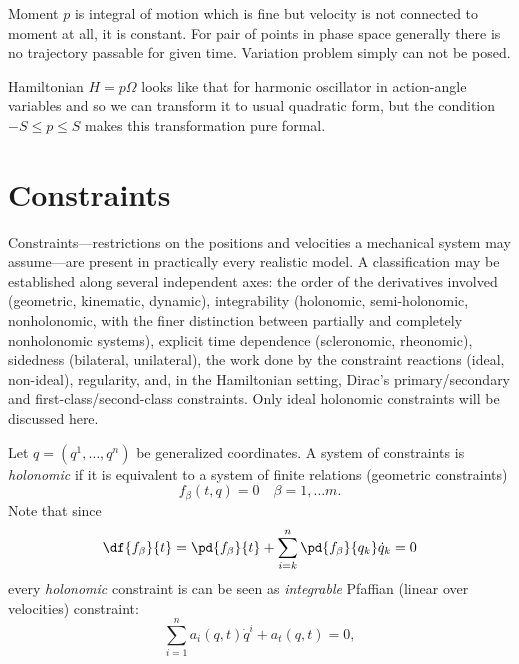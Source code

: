 Moment $ p $ is integral of motion which is fine but velocity is not connected to 
moment at all, it is constant. For pair of points in phase space generally there is
no trajectory passable for given time. Variation problem simply can not be posed.

Hamiltonian $ H=p \Omega $ looks like that for harmonic oscillator in
action-angle variables and so we can  transform it to usual quadratic form, but
the condition $  -S\le p \le S$ makes this transformation pure formal.

\section{Constraints}
\label{sec:cm-const}
Constraints---restrictions on the positions and velocities a mechanical system may
assume---are present in practically every realistic model.   A classification may be established along several independent axes: the order of the
derivatives involved (geometric, kinematic, dynamic), integrability (holonomic,
semi-holonomic, nonholonomic, with the finer distinction between partially and completely
nonholonomic systems), explicit time dependence (scleronomic, rheonomic), sidedness
(bilateral, unilateral), the work done by the constraint reactions (ideal, non-ideal),
regularity, and, in the Hamiltonian setting, Dirac's primary/secondary and
first-class/second-class constraints.
Only ideal holonomic  constraints will be discussed here.

Let $q=(q^1,\dots,q^n)$ be generalized coordinates.
A system of constraints is \emph{holonomic} if it is
    equivalent to a system of finite
relations (geometric constraints)
\begin{equation}
   \label {holonomic-const}
   f_\beta(t,q)=0 \quad \beta =1,\dots m .
\end{equation}
 Note that since
 \[\df{f_\beta}{t}=\pd{f_\beta}{t}+\sum_{i=k}^n\pd{f_\beta}{q_k} \dot q_k=0 \]
every \emph{holonomic} constraint is can be seen as \emph{integrable} 
Pfaffian (linear over velocities) constraint:
\begin{equation}
  \sum_{i=1}^n a_i(q,t) \dot q^i + a_t(q,t) = 0,
  \label{pfaffian-const}
\end{equation}


